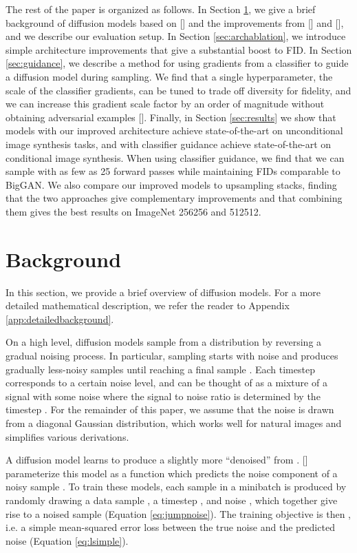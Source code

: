 \documentclass{article}
\newcommand{\shortcite}[1]{[\citenum{#1}]}
\newcommand{\namecite}[1]{\citeauthor{#1} [\citenum{#1}]}
\begin{document}
The rest of the paper is organized as follows. In Section \ref{sec:background}, we give a brief background of diffusion models based on \namecite{ddpm} and the improvements from \namecite{improved} and \namecite{ddim}, and we describe our evaluation setup. In Section \ref{sec:archablation}, we introduce simple architecture improvements that give a substantial boost to FID. In Section \ref{sec:guidance}, we describe a method for using gradients from a classifier to guide a diffusion model during sampling. We find that a single hyperparameter, the scale of the classifier gradients, can be tuned to trade off diversity for fidelity, and we can increase this gradient scale factor by an order of magnitude without obtaining adversarial examples \shortcite{adversarialexamples}.
Finally, in Section \ref{sec:results} we show that models with our improved architecture achieve state-of-the-art on unconditional image synthesis tasks, and with classifier guidance achieve state-of-the-art on conditional image synthesis. When using classifier guidance, we find that we can sample with as few as 25 forward passes while maintaining FIDs comparable to BigGAN. We also compare our improved models to upsampling stacks, finding that the two approaches give complementary improvements and that combining them gives the best results on ImageNet 256256 and 512512.

\section{Background}
\label{sec:background}
In this section, we provide a brief overview of diffusion models. For a more detailed mathematical description, we refer the reader to Appendix \ref{app:detailedbackground}.

On a high level, diffusion models sample from a distribution by reversing a gradual noising process. In particular, sampling starts with noise  and produces gradually less-noisy samples  until reaching a final sample . Each timestep  corresponds to a certain noise level, and  can be thought of as a mixture of a signal  with some noise  where the signal to noise ratio is determined by the timestep . For the remainder of this paper, we assume that the noise  is drawn from a diagonal Gaussian distribution, which works well for natural images and simplifies various derivations.

A diffusion model learns to produce a slightly more ``denoised''  from . \namecite{ddpm} parameterize this model as a function  which predicts the noise component of a noisy sample . To train these models, each sample in a minibatch is produced by randomly drawing a data sample , a timestep , and noise , which together give rise to a noised sample  (Equation \ref{eq:jumpnoise}). 
The training objective is then , i.e. a simple mean-squared error loss between the true noise and the predicted noise (Equation \ref{eq:lsimple}). 
\end{document}
